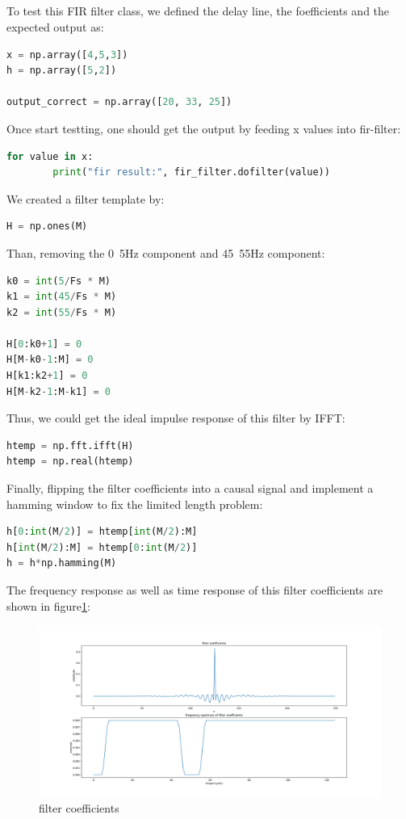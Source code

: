 \documentclass[a4paper,12pt]{article}
\begin{document}
\subsection{}
To test this FIR filter class, we defined the delay line, the foefficients and the expected output as:
\begin{lstlisting}[language=Python]
x = np.array([4,5,3])
h = np.array([5,2])

output_correct = np.array([20, 33, 25])
\end{lstlisting}
Once start testting, one should get the output by feeding x values into fir-filter:
\begin{lstlisting}[language=Python]
for value in x:
		print("fir result:", fir_filter.dofilter(value)) 
\end{lstlisting}
We created a filter template by:
\begin{lstlisting}[language=Python]
H = np.ones(M)
\end{lstlisting}
Than,  removing the 0~5Hz component and 45~55Hz component:
\begin{lstlisting}[language=Python]
k0 = int(5/Fs * M)
k1 = int(45/Fs * M)
k2 = int(55/Fs * M)

H[0:k0+1] = 0
H[M-k0-1:M] = 0
H[k1:k2+1] = 0
H[M-k2-1:M-k1] = 0
\end{lstlisting}
Thus, we could get the ideal impulse response of this filter by IFFT:
\begin{lstlisting}[language=Python]
htemp = np.fft.ifft(H)
htemp = np.real(htemp)
\end{lstlisting}
Finally, flipping the filter coefficients into a causal signal and implement a hamming window to fix the limited length problem:
\begin{lstlisting}[language=Python]
h[0:int(M/2)] = htemp[int(M/2):M]
h[int(M/2):M] = htemp[0:int(M/2)]
h = h*np.hamming(M)
\end{lstlisting}
The frequency response as well as time response of this filter coefficients are shown in figure\ref{fig_H}:
\begin{figure}[h]   
	\centering 
	\includegraphics[width=12cm]{../Figures/filterCoefficients.pdf} 
	\caption{filter coefficients}   
	\label{fig_H}
\end{figure}
\end{document}
